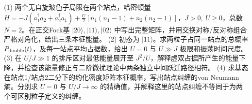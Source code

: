 (1) 两个无自旋玻色子局限在两个站点，哈密顿量 \(H=-J(a_1^\dagger a_2+a_2^\dagger a_1)+\frac U2[n_1(n_1-1)+n_2(n_2-1)]\)，\(J>0,\ U\ge0\)，总数 \(N=2\)。在正交Fock基 \(|20\rangle,|11\rangle,|02\rangle\) 中写出完整矩阵，并用交换对称/反对称组合严格对角化，给出三条本征能量。
(2) 初态为 \(|11\rangle\)。求两粒子占同一站点的总概率 \(P_{\rm double}(t)\)，及每一站点平均占据数，给出 \(U=0\) 与 \(U\gg J\) 极限和振荡时间尺度。
(3) 在 \(U/J\gg1\) 的排斥区对最低能量展开至 \(J^2/U\)，解释虚双占据所产生的能量下降，并检查该能量修正与二阶微扰理论中两条独立中间跃迁路径相符。
(4) 求基态在站点1/站点2二分下的约化密度矩阵本征概率，写出站点纠缠的von Neumann熵。分别求 \(U=0\) 与 \(U/J\to\infty\) 的精确值，并解释这里的站点纠缠不等同于为两个可区别粒子定义的纠缠。
